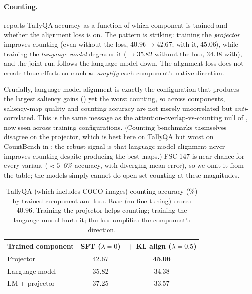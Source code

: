 \paragraph{Counting.}
 reports TallyQA accuracy as a function of which component is trained and whether the alignment loss is on. The pattern is striking: training the \emph{projector} improves counting (even without the loss, $40.96\!\to\!42.67$; with it, $45.06$), while training the \emph{language model} degrades it ($\to\!35.82$ without the loss, $34.38$ with), and the joint run follows the language model down. The alignment loss does not create these effects so much as \emph{amplify} each component's native direction.

Crucially, language-model alignment is exactly the configuration that produces the largest saliency gains () yet the worst counting, so across components, saliency-map quality and counting accuracy are not merely uncorrelated but \emph{anti}-correlated. This is the same message as the attention-overlap-vs-counting null of , now seen across training configurations. (Counting benchmarks themselves disagree on the projector, which is best here on TallyQA but worst on CountBench in ; the robust signal is that language-model alignment never improves counting despite producing the best maps.) FSC-147 is near chance for every variant ($\approx 5$--$6\%$ accuracy, with diverging mean error), so we omit it from the table; the models simply cannot do open-set counting at these magnitudes.

\begin{table}[h]
\centering
\caption{TallyQA (which includes COCO images) counting accuracy (\%) by trained component and loss. Base (no fine-tuning) scores $40.96$. Training the projector helps counting; training the language model hurts it; the loss amplifies the component's direction.}
\label{tab:counting}
\vskip 0.1in
\small
\begin{tabular}{lcc}
\toprule
Trained component & SFT ($\lambda{=}0$) & + KL align ($\lambda{=}0.5$) \\
\midrule
Projector            & 42.67 & \textbf{45.06} \\
Language model       & 35.82 & 34.38 \\
LM + projector       & 37.25 & 33.57 \\
\bottomrule
\end{tabular}
\end{table}
